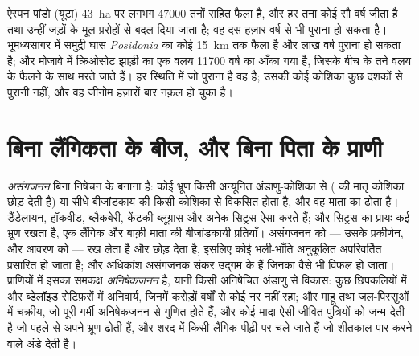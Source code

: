 \begin{example}[सबसे पुराने जीव]\label{ex:b2:asexual-reproduction:oldest}
ऐस्पन  पांडो (यूटा) \qty{43}{ha} पर लगभग
\num{47000} तनों सहित फैला है, और हर तना कोई सौ वर्ष जीता है तथा उन्हीं
जड़ों के मूल-प्ररोहों से बदल दिया जाता है; वह  दस हज़ार
वर्ष से भी पुराना हो सकता है। भूमध्यसागर में समुद्री घास
\emph{Posidonia} का कोई  \qty{15}{km} तक फैला है और लाख वर्ष
पुराना हो सकता है; और मोजावे में क्रिओसोट झाड़ी का एक वलय
\num{11700} वर्ष का आँका गया है, जिसके बीच के तने वलय के फैलने के साथ
मरते जाते हैं। हर स्थिति में जो पुराना है वह  है; उसकी कोई कोशिका
कुछ दशकों से पुरानी नहीं, और वह जीनोम हज़ारों बार नक़ल हो चुका है।
\end{example}

\section{बिना लैंगिकता के बीज, और बिना पिता के प्राणी}

\begin{definition}[असंगजनन]\label{def:b2:asexual-reproduction:apomixis}
\emph{असंगजनन} बिना निषेचन के  बनाना है: कोई भ्रूण किसी
अन्यूनित अंडाणु-कोशिका से ( की मातृ कोशिका
 छोड़ देती है) या सीधे बीजांडकाय की किसी कोशिका से
विकसित होता है, और वह  माता का  ढोता है। डैंडेलायन, हॉकवीड,
ब्लैकबेरी, केंटकी ब्लूग्रास और अनेक सिट्रस ऐसा करते हैं; और सिट्रस का
 प्रायः कई भ्रूण रखता है, एक लैंगिक और बाक़ी माता की
बीजांडकायी प्रतियाँ। असंगजनन  को --- उसके प्रकीर्णन,  और
आवरण को --- रख लेता है और  छोड़ देता है, इसलिए कोई
भली-भाँति अनुकूलित  अपरिवर्तित प्रसारित हो जाता है; और
अधिकांश असंगजनक संकर उद्गम के  हैं जिनका
 वैसे भी विफल हो जाता। प्राणियों में इसका समकक्ष
\emph{अनिषेकजनन} है, यानी किसी अनिषेचित अंडाणु से विकास:
कुछ छिपकलियों में और ब्डेलॉइड रोटिफ़रों में अनिवार्य, जिनमें करोड़ों
वर्षों से कोई नर नहीं रहा; और माहू तथा जल-पिस्सुओं में चक्रीय, जो पूरी
गर्मी अनिषेकजनन से गुणित होते हैं, और कोई मादा ऐसी जीवित पुत्रियों को
जन्म देती है जो पहले से अपने भ्रूण ढोती हैं, और शरद में किसी लैंगिक
पीढ़ी पर चले जाते हैं जो शीतकाल पार करने वाले अंडे देती है।
\end{definition}

